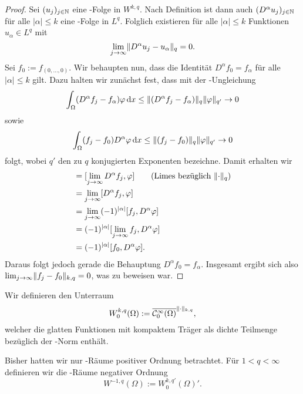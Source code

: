 \begin{proof}
  Sei $(u_j)_{j \in \mathbb{N}}$ eine \cauchy\hyp{}Folge in $W^{k,q}$.
  Nach Definition ist dann auch $(D^\alpha u_j)_{j \in \mathbb{N}}$ für alle $|\alpha| \leq k$ eine \cauchy\hyp{}Folge in $L^q$.
  Folglich existieren für alle $|\alpha| \leq k$ Funktionen $u_\alpha \in L^q$ mit 
  $$
  \lim_{j \to \infty} \lVert D^\alpha u_j - u_\alpha \rVert_q = 0.
  $$
  Sei $f_0 := f_{(0,\dots,0)}$.
  Wir behaupten nun, dass die Identität $D^\alpha f_0 = f_\alpha$ für alle $|\alpha| \leq k$ gilt.
  Dazu halten wir zunächst fest, dass mit der \hoelder\hyp{}Ungleichung
  $$
  \int_\Omega (D^\alpha f_j - f_\alpha) \varphi \, {\operatorname{d}\!{x}}
  \leq \lVert (D^\alpha f_j - f_\alpha) \rVert_q \lVert \varphi \rVert_{q'} \to 0
  $$
  sowie
  $$
  \int_\Omega (f_j - f_0) D^\alpha \varphi \, {\operatorname{d}\!{x}}
  \leq \lVert (f_j - f_0) \rVert_q \lVert \varphi \rVert_{q'} \to 0
  $$
  folgt, wobei $q'$ den zu $q$ konjugierten Exponenten bezeichne.
  Damit erhalten wir
  \begin{align*}
    [f_\alpha, \varphi] 
    &= [\lim_{j \to \infty} D^\alpha f_j, \varphi] \tag{Limes bezüglich $\norm{\cdot}_q$} \\
    &= \lim_{j \to \infty} [D^\alpha f_j, \varphi] \\
    &= \lim_{j \to \infty} (-1)^{|\alpha|}[f_j, D^\alpha \varphi] \\
    &=  (-1)^{|\alpha|}[\lim_{j \to \infty} f_j, D^\alpha \varphi] \\
    &=  (-1)^{|\alpha|}[f_0, D^\alpha \varphi].
  \end{align*}
  Daraus folgt jedoch gerade die Behauptung $D^\alpha f_0 = f_\alpha$.
  Insgesamt ergibt sich also $\lim_{j \to \infty} \lVert f_j - f_0 \rVert_{k,q} =  0$, was zu beweisen war.
\end{proof}

Wir definieren den Unterraum
$$
  W_0^{k,q}(\Omega) := \overline{\mathcal{C}_0^\infty(\Omega)}^{\lVert \cdot \rVert_{k,q}},
$$
welcher die glatten Funktionen mit kompaktem Träger als dichte Teilmenge bezüglich der \sobolev\hyp{}Norm enthält.

Bisher hatten wir nur \sobolev\hyp{}Räume positiver Ordnung betrachtet.
Für $1 < q < \infty$ definieren wir die \sobolev\hyp{}Räume negativer Ordnung 
$$
  W^{-1,q}(\Omega) := W_0^{k,q'}(\Omega)'.
$$


